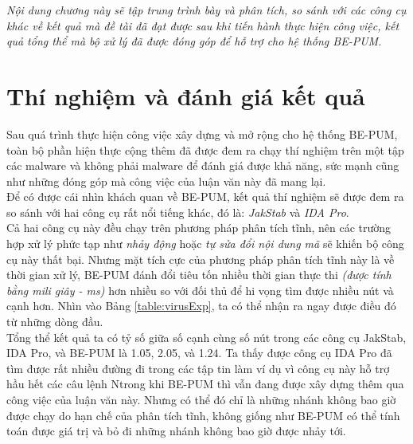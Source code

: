
\begin{concept}[15cm]
\textit{Nội dung chương này sẽ tập trung trình bày và phân tích, so sánh với các công cụ khác về kết quả mà đề tài đã đạt được sau khi tiến hành thực hiện công việc, kết quả tổng thể mà bộ xử lý đã được đóng góp để hỗ trợ cho hệ thống BE-PUM.}
\end{concept}

\section{Thí nghiệm và đánh giá kết quả}

Sau quá trình thực hiện công việc xây dựng và mở rộng cho hệ thống BE-PUM, toàn bộ phần hiện thực cộng thêm đã được đem ra chạy thí nghiệm trên một tập các malware và không phải malware để đánh giá được khả năng, sức mạnh cũng như những đóng góp mà công việc của luận văn này đã mang lại. \\

Để có được cái nhìn khách quan về BE-PUM, kết quả thí nghiệm sẽ được đem ra so sánh với hai công cụ rất nổi tiếng khác, đó là: \textit{JakStab} và \textit{IDA Pro}.\\

Cả hai công cụ này đều chạy trên phương pháp phân tích tĩnh, nên các trường hợp xử lý phức tạp như \textit{nhảy động} hoặc \textit{tự sửa đổi nội dung mã} sẽ khiến bộ công cụ này thất bại. Nhưng mặt tích cực của phương pháp phân tích tĩnh này là về thời gian xử lý, BE-PUM đánh đổi tiêu tốn nhiều thời gian thực thi \textit{(được tính bằng mili giây - ms)} hơn nhiều so với đối thủ để hi vọng tìm được nhiều nút và cạnh hơn. Nhìn vào Bảng \ref{table:virusExp}, ta có thể nhận ra ngay được điều đó từ những dòng đầu. \\

Tổng thể kết quả ta có tỷ số giữa số cạnh cùng số nút trong các công cụ JakStab, IDA Pro, và BE-PUM là 1.05, 2.05, và 1.24. Ta thấy được công cụ IDA Pro đã tìm được rất nhiều đường đi trong các tập tin làm ví dụ vì công cụ này hỗ trợ hầu hết các câu lệnh Ntrong khi BE-PUM thì vẫn đang được xây dựng thêm qua công việc của luận văn này. Nhưng có thể đó chỉ là những nhánh không bao giờ được chạy do hạn chế của phân tích tĩnh, không giống như BE-PUM có thể tính toán được giá trị và bỏ đi những nhánh không bao giờ được nhảy tới.

